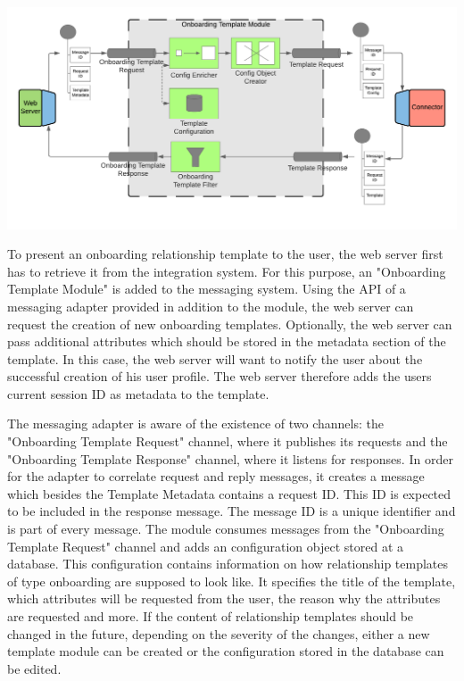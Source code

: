 \begin{center}
    \includegraphics[scale=0.6]{Diagrams/Integration Architecture 1/Technological Integration/6. Onboarding Template Module.pdf}
\end{center}

To present an onboarding relationship template to the user, the web server first has to retrieve it from the integration system. For this purpose, an "Onboarding Template Module" is added to the messaging system. Using the API of a messaging adapter provided in addition to the module, the web server can request the creation of new onboarding templates. Optionally, the web server can pass additional attributes which should be stored in the metadata section of the template. In this case, the web server will want to notify the user about the successful creation of his user profile. The web server therefore adds the users current session ID as metadata to the template.

The messaging adapter is aware of the existence of two channels: the "Onboarding Template Request" channel, where it publishes its requests and the "Onboarding Template Response" channel, where it listens for responses. In order for the adapter to correlate request and reply messages, it creates a message which besides the Template Metadata contains a request ID. This ID is expected to be included in the response message. The message ID is a unique identifier and is part of every message. The module consumes messages from the "Onboarding Template Request" channel and adds an configuration object stored at a database. This configuration contains information on how relationship templates of type onboarding are supposed to look like. It specifies the title of the template, which attributes will be requested from the user, the reason why the attributes are requested and more. If the content of relationship templates should be changed in the future, depending on the severity of the changes, either a new template module can be created or the configuration stored in the database can be edited.


